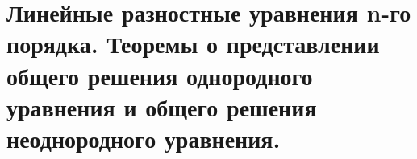 \section{Линейные разностные уравнения n-го порядка. Теоремы о представлении общего решения однородного уравнения и общего решения неоднородного уравнения.}
